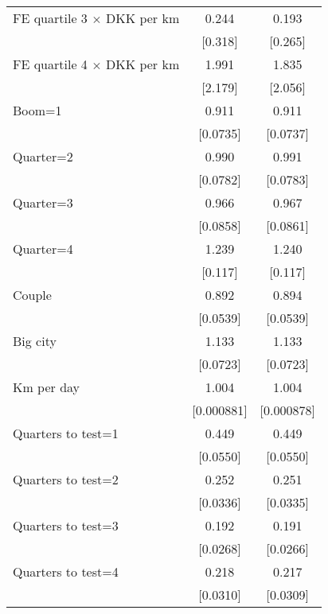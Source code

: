 \begin{longtable}{lcc}
FE quartile 3 $\times$ DKK per km&       0.244         &       0.193         \tabularnewline
                    &     [0.318]         &     [0.265]         \tabularnewline
 
FE quartile 4 $\times$ DKK per km&       1.991         &       1.835         \tabularnewline
                    &     [2.179]         &     [2.056]         \tabularnewline
 
Boom=1              &       0.911         &       0.911         \tabularnewline
                    &    [0.0735]         &    [0.0737]         \tabularnewline
 
Quarter=2           &       0.990         &       0.991         \tabularnewline
                    &    [0.0782]         &    [0.0783]         \tabularnewline
 
Quarter=3           &       0.966         &       0.967         \tabularnewline
                    &    [0.0858]         &    [0.0861]         \tabularnewline
 
Quarter=4           &       1.239\sym{*}  &       1.240\sym{*}  \tabularnewline
                    &     [0.117]         &     [0.117]         \tabularnewline
 
Couple              &       0.892         &       0.894         \tabularnewline
                    &    [0.0539]         &    [0.0539]         \tabularnewline
 
Big city            &       1.133         &       1.133         \tabularnewline
                    &    [0.0723]         &    [0.0723]         \tabularnewline
 
Km per day          &       1.004\sym{***}&       1.004\sym{***}\tabularnewline
                    &  [0.000881]         &  [0.000878]         \tabularnewline
 
Quarters to test=1  &       0.449\sym{***}&       0.449\sym{***}\tabularnewline
                    &    [0.0550]         &    [0.0550]         \tabularnewline
 
Quarters to test=2  &       0.252\sym{***}&       0.251\sym{***}\tabularnewline
                    &    [0.0336]         &    [0.0335]         \tabularnewline
 
Quarters to test=3  &       0.192\sym{***}&       0.191\sym{***}\tabularnewline
                    &    [0.0268]         &    [0.0266]         \tabularnewline
 
Quarters to test=4  &       0.218\sym{***}&       0.217\sym{***}\tabularnewline
                    &    [0.0310]         &    [0.0309]         \tabularnewline
 

\end{longtable}
